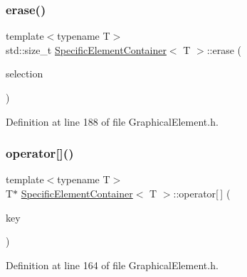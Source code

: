 \subsubsection{\texorpdfstring{erase()}{erase()}\hspace{0.1cm}{\footnotesize\ttfamily [2/2]}}
{\footnotesize\ttfamily template$<$typename T$>$ \\
std\+::size\+\_\+t \hyperlink{class_specific_element_container}{Specific\+Element\+Container}$<$ T $>$\+::erase (\begin{DoxyParamCaption}\item[{const \hyperlink{struct_selection}{Selection} \&}]{selection }\end{DoxyParamCaption})\hspace{0.3cm}{\ttfamily [inline]}}



Definition at line 188 of file Graphical\+Element.\+h.

\mbox{\label{class_specific_element_container_ae61c1d81ff22ca1bb4d37f0917710a4b}} 
\subsubsection{\texorpdfstring{operator[]()}{operator[]()}\hspace{0.1cm}{\footnotesize\ttfamily [1/2]}}
{\footnotesize\ttfamily template$<$typename T$>$ \\
T$\ast$ \hyperlink{class_specific_element_container}{Specific\+Element\+Container}$<$ T $>$\+::operator\mbox{[}$\,$\mbox{]} (\begin{DoxyParamCaption}\item[{const \hyperlink{_graphical_element_8h_ade5fd6c85839a416577ff9de1605141e}{Element\+Key} \&}]{key }\end{DoxyParamCaption})\hspace{0.3cm}{\ttfamily [inline]}}



Definition at line 164 of file Graphical\+Element.\+h.

\mbox{\label{class_specific_element_container_a6a024841f2b43dc4e3c467d401434d28}} 

